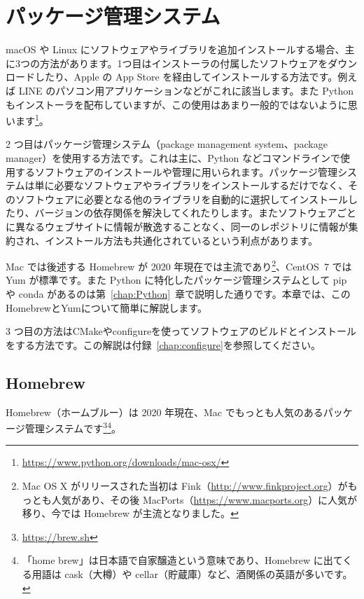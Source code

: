 \setcounter{chapter}{0}
\renewcommand{\thechapter}{\Alph{chapter}}
\setcounter{equation}{0}
\renewcommand{\theequation}{\Alph{chapter}.\arabic{equation}}
\setcounter{figure}{0}
\renewcommand{\thefigure}{\Alph{chapter}.\arabic{figure}}
\setcounter{table}{0}
\renewcommand{\thetable}{\Alph{chapter}.\arabic{table}}
\appendix

\chapter{パッケージ管理システム}
\label{chap:package}
macOS や Linux にソフトウェアやライブラリを追加インストールする場合、主に3つの方法があります。1つ目はインストーラの付属したソフトウェアをダウンロードしたり、Apple の App Store を経由してインストールする方法です。例えば LINE のパソコン用アプリケーションなどがこれに該当します。また Python もインストーラを配布していますが、この使用はあまり一般的ではないように思います\footnote{\url{https://www.python.org/downloads/mac-osx/}}。

2 つ目はパッケージ管理システム（package management system、package manager）を使用する方法です。これは主に、Python などコマンドラインで使用するソフトウェアのインストールや管理に用いられます。パッケージ管理システムは単に必要なソフトウェアやライブラリをインストールするだけでなく、そのソフトウェアに必要となる他のライブラリを自動的に選択してインストールしたり、バージョンの依存関係を解決してくれたりします。またソフトウェアごとに異なるウェブサイトに情報が散逸することなく、同一のレポジトリに情報が集約され、インストール方法も共通化されているという利点があります。

Mac では後述する Homebrew が 2020 年現在では主流であり\footnote{Mac OS X がリリースされた当初は Fink（\url{http://www.finkproject.org}）がもっとも人気があり、その後 MacPorts（\url{https://www.macports.org}）に人気が移り、今では Homebrew が主流となりました。}、CentOS~7 では Yum が標準です。また Python に特化したパッケージ管理システムとして pip や conda があるのは第~\ref{chap:Python}~章で説明した通りです。本章では、このHomebrewとYumについて簡単に解説します。

3 つ目の方法はCMakeやconfigureを使ってソフトウェアのビルドとインストールをする方法です。この解説は付録~\ref{chap:configure}を参照してください。

\section{Homebrew}
\label{sec:Homebrew}
Homebrew（ホームブルー）は 2020 年現在、Mac でもっとも人気のあるパッケージ管理システムです\footnote{\url{https://brew.sh}}\footnote{「home brew」は日本語で自家醸造という意味であり、Homebrew に出てくる用語は cask（大樽）や cellar（貯蔵庫）など、酒関係の英語が多いです。}。

